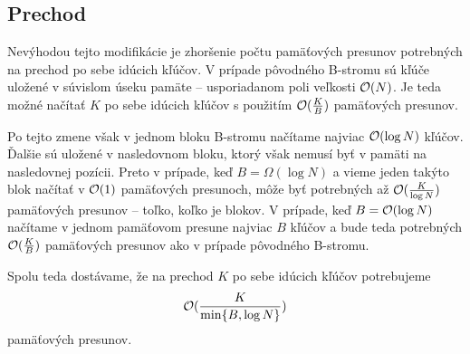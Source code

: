 \subsection{Prechod}
Nevýhodou tejto modifikácie je zhoršenie počtu pamäťových presunov potrebných na prechod po sebe idúcich kľúčov. V prípade pôvodného \obliv B-stromu sú kľúče uložené v súvislom úseku pamäte -- usporiadanom poli veľkosti $\mathcal{O}(N)$. Je teda možné načítať $K$ po sebe idúcich kľúčov s použitím $\mathcal{O}(\frac{K}{B})$ pamäťových presunov.

Po tejto zmene však v jednom bloku B-stromu načítame najviac $\mathcal{O}(\log N)$ kľúčov. Ďalšie sú uložené v nasledovnom bloku, ktorý však nemusí byť v pamäti na nasledovnej pozícii. Preto v prípade, keď $B =\Omega(\log N)$ a vieme jeden takýto blok načítať v $\mathcal{O}(1)$ pamäťových presunoch, môže byť potrebných až $\mathcal{O}(\frac{K}{\log N})$ pamäťových presunov -- toľko, koľko je blokov. V prípade, keď $B = \mathcal{O}(\log N)$ načítame v jednom pamäťovom presune najviac $B$ kľúčov a bude teda potrebných $\mathcal{O}(\frac{K}{B})$ pamäťových presunov ako v prípade pôvodného \obliv B-stromu.

Spolu teda dostávame, že na prechod $K$ po sebe idúcich kľúčov potrebujeme
\[
\mathcal{O}(\frac{K}{\min\{B,\log N\}})
\]
pamäťových presunov.





